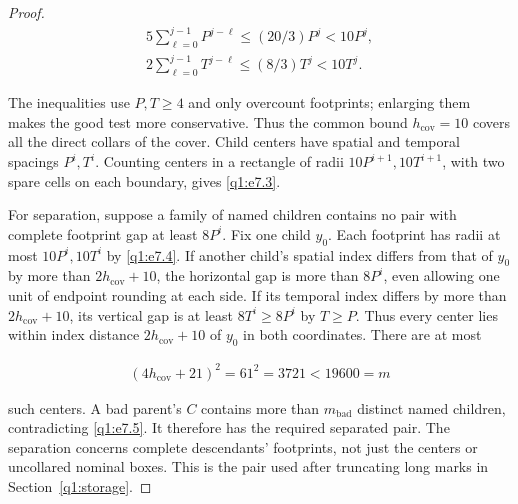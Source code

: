 \begin{proof}
\begin{equation}\label{q1:e7.4}
\begin{gathered}
5 \sum _{\ell=0}^{j-1} P^{j-\ell} \le  (20/3)P^{j} <10P^{j}, \\ 2 \sum _{\ell=0}^{j-1} T^{j-\ell} \le  (8/3)T^{j} <10T^{j}.
\end{gathered}
\end{equation}

The inequalities use \(P,T\ge 4\) and only overcount footprints; enlarging them makes the good test more conservative. Thus the common bound \(h_{\mathrm{cov}}=10\) covers all the direct collars of the cover. Child centers have spatial and temporal spacings \(P^{i},T^{i}\). Counting centers in a rectangle of radii \(10P^{i+1},10T^{i+1}\), with two spare cells on each boundary, gives \eqref{q1:e7.3}.

For separation, suppose a family of named children contains no pair with complete footprint gap at least \(8P^{i}\). Fix one child \(y_0\). Each footprint has radii at most \(10P^{i},10T^{i}\) by \eqref{q1:e7.4}. If another child's spatial index differs from that of \(y_0\) by more than \(2h_{\mathrm{cov}}+10\), the horizontal gap is more than \(8P^{i}\), even allowing one unit of endpoint rounding at each side. If its temporal index differs by more than \(2h_{\mathrm{cov}}+10\), its vertical gap is at least \(8T^{i}\ge 8P^{i}\) by \(T\ge P\). Thus every center lies within index distance \(2h_{\mathrm{cov}}+10\) of \(y_0\) in both coordinates. There are at most

\begin{equation}\label{q1:e7.5}
\begin{gathered}
(4h_{\mathrm{cov}}+21)^{2}=61^{2}=3721 <19600=m
\end{gathered}
\end{equation}

such centers. A bad parent's \(C\) contains more than \(m_{\mathrm{bad}}\) distinct named children, contradicting \eqref{q1:e7.5}. It therefore has the required separated pair. The separation concerns complete descendants' footprints, not just the centers or uncollared nominal boxes. This is the pair used after truncating long marks in Section~\ref{q1:storage}. 
\end{proof}



